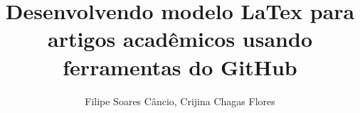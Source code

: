 \title{Desenvolvendo modelo LaTex para artigos acadêmicos usando ferramentas do GitHub}

\author{Filipe Soares Câncio, Crijina Chagas Flores }


\address{IFBA – Instituto Federal de Educação, Ciência e Tecnologia da Bahia\\
Vitória da Conquista – BA – Brasil
}
